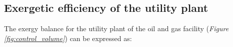 	
	



	
	

\subsection{Exergetic efficiency of the utility plant}
\label{section:eff_utility}

The exergy balance for the utility plant of the oil and gas facility (\emph{Figure \ref{fig:control_volume}}) can be expressed as:
	
